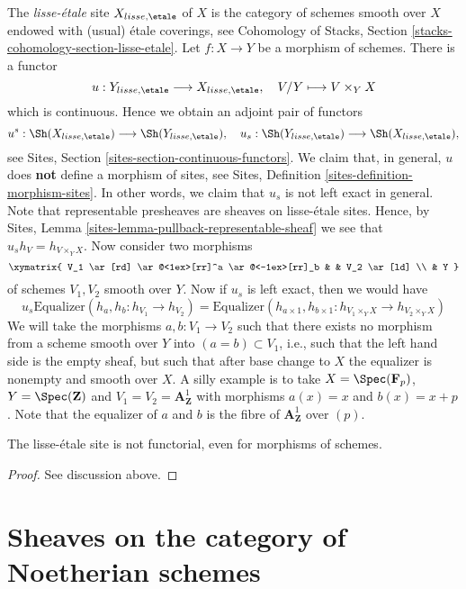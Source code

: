 \noindent
The {\it lisse-\'etale} site
$X_{lisse,\etale}$ of $X$ is the category of schemes smooth over $X$
endowed with (usual) \'etale coverings, see
Cohomology of Stacks, Section \ref{stacks-cohomology-section-lisse-etale}.
Let $f : X  \to Y$ be a morphism of schemes.
There is a functor
$$
u : Y_{lisse,\etale} \longrightarrow X_{lisse,\etale},\quad
V/Y \longmapsto V \times_Y X
$$
which is continuous. Hence we obtain an adjoint pair of functors
$$
u^s :
\Sh(X_{lisse,\etale})
\longrightarrow
\Sh(Y_{lisse,\etale}),
\quad
u_s :
\Sh(Y_{lisse,\etale})
\longrightarrow
\Sh(X_{lisse,\etale}),
$$
see Sites, Section \ref{sites-section-continuous-functors}.
We claim that, in general, $u$ does {\bf not} define a morphism of sites, see
Sites, Definition \ref{sites-definition-morphism-sites}.
In other words, we claim that $u_s$ is not left exact in general. Note that
representable presheaves are sheaves on lisse-\'etale sites. Hence, by
Sites, Lemma \ref{sites-lemma-pullback-representable-sheaf}
we see that $u_sh_V = h_{V \times_Y X}$. Now consider two morphisms
$$
\xymatrix{
V_1 \ar[rd] \ar@<1ex>[rr]^a \ar@<-1ex>[rr]_b & & V_2 \ar[ld] \\
& Y
}
$$
of schemes $V_1, V_2$ smooth over $Y$. Now if $u_s$ is left exact, then
we would have
$$
u_s \text{Equalizer}(h_a, h_b : h_{V_1} \to h_{V_2})
=
\text{Equalizer}(h_{a \times 1}, h_{b \times 1} :
h_{V_1 \times_Y X} \to h_{V_2 \times_Y X})
$$
We will take the morphisms $a, b : V_1 \to V_2$ such that there exists
no morphism from a scheme smooth over $Y$ into $(a = b) \subset V_1$, i.e.,
such that the left hand side is the empty sheaf, but such that after
base change to $X$ the equalizer is nonempty and smooth over $X$.
A silly example is to take $X = \Spec(\mathbf{F}_p)$,
$Y = \Spec(\mathbf{Z})$ and $V_1 = V_2 = \mathbf{A}^1_\mathbf{Z}$
with morphisms $a(x) = x$ and $b(x) = x + p$. Note that the equalizer
of $a$ and $b$ is the fibre of $\mathbf{A}^1_\mathbf{Z}$ over $(p)$.

\begin{lemma}
\label{lemma-lisse-etale-not-functorial}
The lisse-\'etale site is not functorial, even for morphisms of schemes.
\end{lemma}

\begin{proof}
See discussion above.
\end{proof}






\section{Sheaves on the category of Noetherian schemes}
\label{section-sheaves-locally-Noetherian}

